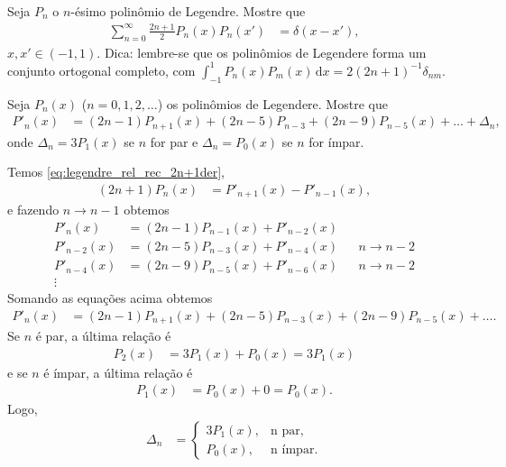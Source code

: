 \documentclass[a4paper,12pt, leqno, answers]{exam}
\begin{document}
\begin{questions}
    \question[E de 2010] Seja $P_n$ o $n$-\'{e}simo polin\^{o}mio de Legendre. Mostre que
    \begin{align*}
        \sum_{n = 0}^\infty \frac{2n + 1}{2} P_n(x) P_n(x') &= \delta(x - x'),
    \end{align*}
    $x, x' \in (-1, 1)$. Dica: lembre-se que os polin\^{o}mios de Legendere forma um conjunto ortogonal completo, com $\int_{-1}^1 P_n(x) P_m(x) \,\mathrm{d}x = 2 (2 n + 1)^{-1} \delta_{nm}$.
    \begin{solution}
    \end{solution}

    \question[T6 de 2011] Seja $P_n(x)$ ($n = 0, 1, 2, \ldots$) os polin\^{o}mios de Legendere. Mostre que
    \begin{align*}
        P'_n(x) &= (2n - 1) P_{n + 1}(x) + (2n - 5) P_{n - 3} + (2n - 9) P_{n - 5}(x) + \ldots + \Delta_n,
    \end{align*}
    onde $\Delta_n = 3 P_1(x)$ se $n$ for par e $\Delta_n = P_0(x)$ se $n$ for \'{i}mpar.
    \begin{solution}
        Temos \eqref{eq:legendre_rel_rec_2n+1der}, 
        \begin{align*}
            (2n + 1) P_n(x) &= P'_{n + 1}(x) - P'_{n - 1}(x),
        \end{align*}
        e fazendo $n \to n - 1$ obtemos
        \begin{align*}
            P'_n(x) &= (2n - 1) P_{n - 1}(x) + P'_{n - 2}(x) \\
            P'_{n - 2}(x) &= (2n - 5) P_{n - 3}(x) + P'_{n - 4}(x) && n \to n - 2 \\
            P'_{n - 4}(x) &= (2n - 9) P_{n - 5} (x)+ P'_{n - 6}(x) && n \to n - 2 \\
            \vdots
        \end{align*}
        Somando as equa\c{c}\~{o}es acima obtemos
        \begin{align*}
            P'_n(x) &= (2n - 1) P_{n + 1}(x) + (2n - 5) P_{n - 3}(x) + (2n - 9) P_{n - 5}(x) + \ldots.
        \end{align*}
        Se $n$ \'{e} par, a \'{u}ltima rela\c{c}\~{a}o \'{e}
        \begin{align*}
            P_2(x) &= 3 P_1(x) + P_0(x) = 3 P_1(x)
        \end{align*}
        e se $n$ \'{e} \'{i}mpar, a \'{u}ltima rela\c{c}\~{a}o \'{e}
        \begin{align*}
            P_1(x) &= P_0(x) + 0 = P_0(x).
        \end{align*}
        Logo,
        \begin{align*}
            \Delta_n &= \begin{cases}
                3 P_1(x), & \text{n par}, \\
                P_0(x), & \text{n \'{i}mpar}.
            \end{cases}
        \end{align*}
    \end{solution}


\end{questions}
\end{document}
